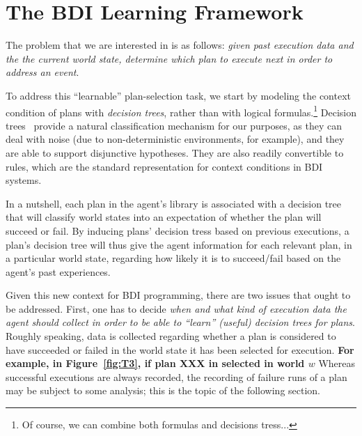 \section{The BDI Learning Framework}\label{sec:framework}


The problem that we are interested in is as follows: \emph{given past execution
data and the the current world state, determine which plan to execute next 
in order to address an event}.


To address this ``learnable'' plan-selection task, we start by modeling the
context condition of plans with \emph{decision trees}, rather than with logical
formulas.\footnote{Of course, we can combine both formulas and decisions
tress...}
Decision trees~\cite{Mitchell97:ML}  provide a natural classification mechanism
for our purposes, as they can deal with noise (due to non-deterministic
environments, for example), and they are able to support disjunctive hypotheses.
They are also readily convertible to rules, which are the standard representation
for context conditions in BDI systems.




In a nutshell, each plan in the agent's library is associated with a decision
tree that will classify world states into an expectation of whether the plan will
succeed or fail. By inducing plans' decision tress based on previous executions,
a plan's decision tree will thus give the agent information for each relevant
plan, in a particular world state, regarding how likely it is to succeed/fail
based on the agent's past experiences.



Given this new context for BDI programming, there are two issues that ought to be
addressed.
First, one has to decide \emph{when and what kind of execution data the agent should
collect in order to be able to ``learn'' (useful) decision trees for plans}.
Roughly speaking, data is collected regarding whether a plan is considered to
have succeeded or failed in the world state it has been selected for execution.
\textbf{For example, in Figure~\ref{fig:T3}, if plan XXX in selected in world
$w$} %
Whereas successful executions are always recorded, the recording of failure runs
of a plan may be subject to some analysis; this is the topic of the following section.



